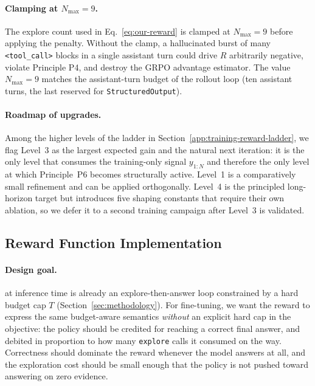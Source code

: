\paragraph{Clamping at $N_{\max} = 9$.}
The explore count used in Eq.~\eqref{eq:our-reward} is clamped at $N_{\max} = 9$ before applying the penalty. Without the clamp, a hallucinated burst of many \texttt{<tool\_call>} blocks in a single assistant turn could drive $R$ arbitrarily negative, violate Principle P4, and destroy the GRPO advantage estimator. The value $N_{\max} = 9$ matches the assistant-turn budget of the rollout loop (ten assistant turns, the last reserved for \texttt{StructuredOutput}).

\paragraph{Roadmap of upgrades.}
Among the higher levels of the ladder in Section~\ref{app:training-reward-ladder}, we flag Level~3 as the largest expected gain and the natural next iteration: it is the only level that consumes the training-only signal $y_{1:N}$ and therefore the only level at which Principle~P6 becomes structurally active. Level~1 is a comparatively small refinement and can be applied orthogonally. Level~4 is the principled long-horizon target but introduces five shaping constants that require their own ablation, so we defer it to a second training campaign after Level~3 is validated.

\subsection{Reward Function Implementation}
\label{app:training-reward}

\paragraph{Design goal.}
\our{} at inference time is already an explore-then-answer loop constrained by a hard budget cap $T$ (Section~\ref{sec:methodology}). For fine-tuning, we want the reward to express the same budget-aware semantics \emph{without} an explicit hard cap in the objective: the policy should be credited for reaching a correct final answer, and debited in proportion to how many \texttt{explore} calls it consumed on the way. Correctness should dominate the reward whenever the model answers at all, and the exploration cost should be small enough that the policy is not pushed toward answering on zero evidence.

